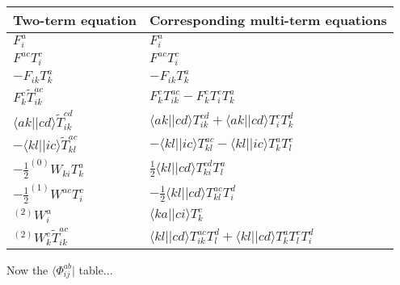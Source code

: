 \documentclass[letterpaper,12pt]{article}
\newcommand{\ket}[1]{\lvert #1 \rangle}
\newcommand{\bra}[1]{\langle #1 \vert}
\begin{document}
\begin{table}[ht]
\centering
\begin{tabular}{|l|l|}
\hline
Two-term equation & Corresponding multi-term equations \\
\hline
$F^a_i$ & $F^a_i$  \\
\hline
$F^{ac}T^c_i$ & $F^{ac}T^c_i$  \\
\hline
$-F_{ik}T^a_k$ & $-F_{ik}T^a_k$  \\
\hline
$F^c_k\tilde{T}^{ac}_{ik}$ & $F^c_kT^{ac}_{ik}
-F^c_kT^c_iT^a_k$  \\
\hline
$\bra{ak}\ket{cd}\tilde{T}^{cd}_{ik}$ 
  & $\bra{ak}\ket{cd}T^{cd}_{ik} 
    +\bra{ak}\ket{cd}T^c_iT^d_k$  \\
\hline
$-\bra{kl}\ket{ic}\tilde{T}^{ac}_{kl}$ 
  & $-\bra{kl}\ket{ic}T^{ac}_{kl}
     -\bra{kl}\ket{ic}T^a_kT^c_l$  \\
\hline
$-\frac{1}{2}^{(0)}W_{ki}T^a_k$ 
  & $\frac{1}{2}\bra{kl}\ket{cd}T^{cd}_{ki}T^a_l$ \\
\hline
$-\frac{1}{2}^{(1)}W^{ac}T^c_i$ 
  & $-\frac{1}{2}\bra{kl}\ket{cd}T^{ac}_{kl}T^d_i$ \\
\hline
$^{(2)}W^a_i$ & $\bra{ka}\ket{ci}T^{c}_{k}$  \\
\hline
$^{(2)}W^{c}_k\tilde{T}^{ac}_{ik}$ 
  & $\bra{kl}\ket{cd}T^{ac}_{ik}T^d_l
    +\bra{kl}\ket{cd}T^a_kT^c_lT^d_i$ \\
\hline
\end{tabular}
\label{tab:twotermPhi1}
\end{table}
Now the $\bra{\Phi^{ab}_{ij}}$ table...\\
\end{document}
